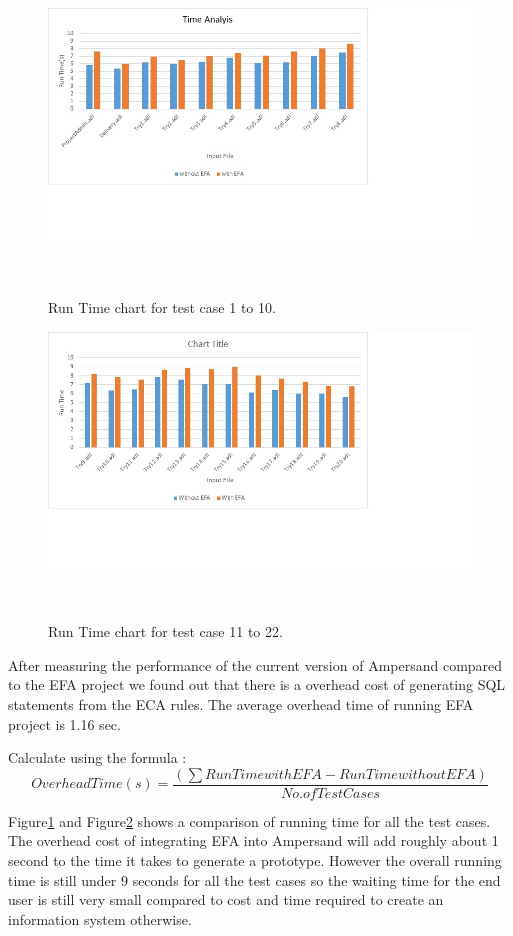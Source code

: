 \documentclass[12pt, svgnames]{article}
\begin{document}
\begin{figure}
  \centering
    \includegraphics[width=1.3\textwidth]{./Chart1}
\caption{Run Time chart for test case 1 to 10.}~\label{fig:figure1}
\end{figure}


\begin{figure}
  \centering
    \includegraphics[width=1.3\textwidth]{./Chart2}
\caption{Run Time chart for test case 11 to 22.}~\label{fig:figure2}
\end{figure}

After measuring the performance of the current version of Ampersand compared to the EFA project we found out that there is a overhead cost of generating SQL statements from the ECA rules. The average overhead time of running EFA project is 1.16 sec. 

Calculate using the formula : 
\begin{equation}
	Overhead Time(s) =\frac{\left ( \sum  Run Time with EFA - Run Time without EFA\right )}{ No. of Test Cases}
\end{equation}

Figure\ref{fig:figure1} and Figure\ref{fig:figure2} shows a comparison of running time for all the test cases. The overhead cost of integrating EFA into Ampersand will add roughly about 1 second to the time it takes to generate a prototype. However the overall running time is still under 9 seconds for all the test cases so the waiting time for the end user is still very small compared to cost and time required to create an information system otherwise.
\end{document}
